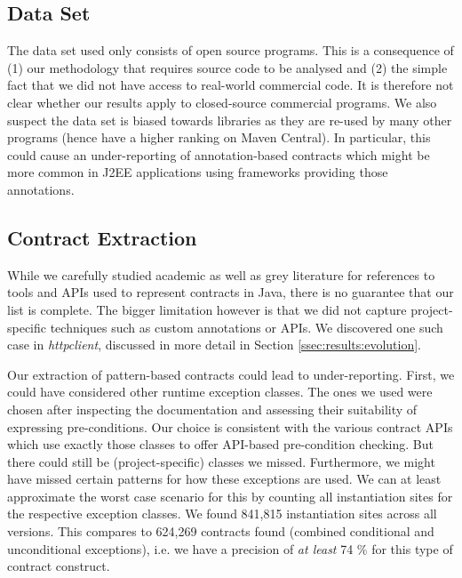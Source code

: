 \documentclass[a4paper,UKenglish]{lipics-v2016}
\begin{document}
\subsection{Data Set} 


The data set used only consists of open source programs. This is a consequence of (1) our methodology that requires source code to be analysed and (2) the simple fact that we did not have access to real-world commercial code. It is therefore not clear whether our results apply to closed-source commercial programs.  We also suspect the data set is biased towards libraries as they are re-used by many other programs (hence have a higher ranking on Maven Central). In particular, this could cause an under-reporting of annotation-based contracts which might be more common in J2EE applications using frameworks providing those annotations. 

\subsection{Contract Extraction}

While we carefully studied academic as well as grey literature for references to tools and APIs used to represent contracts in Java, there is no guarantee that our list is complete. The bigger limitation however is that we did not capture project-specific techniques such as custom annotations or APIs. We discovered one such case in \textit{httpclient}, discussed in more detail in Section \ref{ssec:results:evolution}.

Our extraction of pattern-based contracts could lead to under-reporting. First, we could have considered other runtime exception classes. The ones we used were chosen after inspecting the documentation and assessing their suitability of expressing pre-conditions.  Our choice is consistent with the various contract APIs which use exactly those classes to offer API-based pre-condition checking. But there could still be (project-specific) classes we missed. Furthermore, we might have missed certain patterns for how these exceptions are used. We can at least approximate the worst case scenario for this by counting all instantiation sites for the respective exception classes. We found  841,815 instantiation sites across all versions. This compares to 624,269 contracts found (combined conditional and unconditional exceptions), i.e. we have a precision of \textit{at least} 74 \%  for this type of contract construct.

\end{document}
